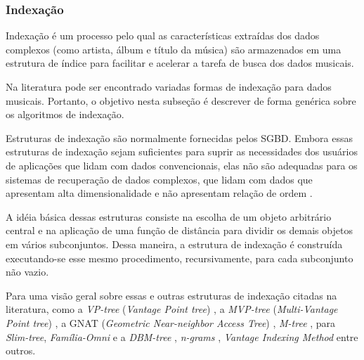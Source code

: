\subsubsection{Indexação}
Indexação é um processo pelo qual as características extraídas dos dados complexos (como artista, álbum e título da música) são armazenados em uma estrutura de índice para facilitar e acelerar a tarefa de busca dos dados musicais.

Na literatura pode ser encontrado variadas formas de indexação para dados musicais. Portanto, o objetivo nesta subseção é descrever de forma genérica sobre os algoritmos de indexação.

Estruturas de indexação são normalmente fornecidas pelos SGBD. Embora essas estruturas de indexação sejam suficientes para suprir as necessidades dos usuários de aplicações que lidam com dados convencionais, elas não são adequadas para os sistemas de recuperação de dados complexos, que lidam com dados que apresentam alta dimensionalidade e não apresentam relação de ordem \cite{barioni2006}.

A idéia básica dessas estruturas consiste na escolha de um objeto arbitrário central e na aplicação de uma função de distância para dividir os demais objetos em vários subconjuntos. Dessa maneira, a estrutura de indexação é construída executando-se esse mesmo procedimento, recursivamente, para cada subconjunto não vazio.

Para uma visão geral sobre essas e outras estruturas de indexação citadas na literatura, como a \textit{VP-tree} (\textit{Vantage Point tree}) \cite{yanilos1993}, a \textit{MVP-tree} (\textit{Multi-Vantage Point tree}) \cite{bozkaya1997}, a GNAT (\textit{Geometric Near-neighbor Access Tree}) \cite{brin1995}, \textit{M-tree} \cite{ciaccia1997}, para \textit{Slim-tree}, \textit{Família-Omni} e a \textit{DBM-tree} \cite{traina2000, filho2001, vieira2004}, \textit{n-grams} \cite{downie1999}, \textit{Vantage Indexing Method} \cite{typke2003} entre outros.
